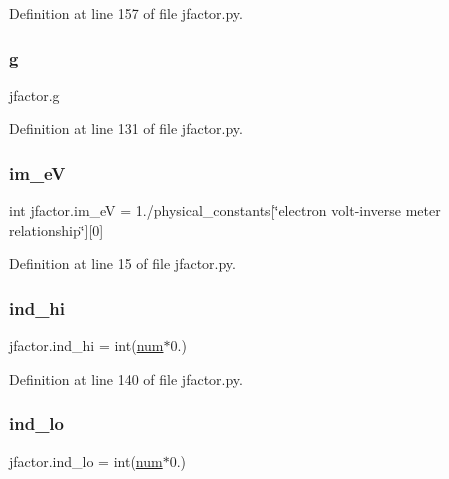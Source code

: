 Definition at line 157 of file jfactor.\+py.

\mbox{\label{namespacejfactor_a1e07b351e264fceb00b01b4a591e45e5}} 
\subsubsection{\texorpdfstring{g}{g}}
{\footnotesize\ttfamily jfactor.\+g}



Definition at line 131 of file jfactor.\+py.

\mbox{\label{namespacejfactor_a3d86861d725265dc096b798369902d43}} 
\subsubsection{\texorpdfstring{im\+\_\+eV}{im\_eV}}
{\footnotesize\ttfamily int jfactor.\+im\+\_\+eV = 1./physical\+\_\+constants\mbox{[}\char`\"{}electron volt-\/inverse meter relationship\char`\"{}\mbox{]}\mbox{[}0\mbox{]}}



Definition at line 15 of file jfactor.\+py.

\mbox{\label{namespacejfactor_a449b6d5eec9600e32c2388268c367957}} 
\subsubsection{\texorpdfstring{ind\+\_\+hi}{ind\_hi}}
{\footnotesize\ttfamily jfactor.\+ind\+\_\+hi = int(\hyperlink{namespacejfactor_a4345d50706cf418a1957595314a7af18}{num}$\ast$0.)}



Definition at line 140 of file jfactor.\+py.

\mbox{\label{namespacejfactor_aaf9c1c756ff45c03f48ccc922857360f}} 
\subsubsection{\texorpdfstring{ind\+\_\+lo}{ind\_lo}}
{\footnotesize\ttfamily jfactor.\+ind\+\_\+lo = int(\hyperlink{namespacejfactor_a4345d50706cf418a1957595314a7af18}{num}$\ast$0.)}



